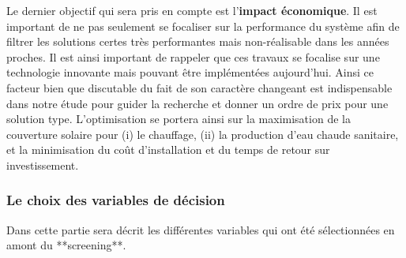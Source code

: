 Le dernier objectif qui sera pris en compte est l’\textbf{impact économique}. Il
est important de ne pas seulement se focaliser sur la performance du système afin
de filtrer les solutions certes très performantes mais non-réalisable dans les années
proches. Il est ainsi important de rappeler que ces travaux se focalise sur une
technologie innovante mais pouvant être implémentées aujourd’hui.
Ainsi ce facteur bien que discutable du fait de son caractère changeant est indispensable
dans notre étude pour guider la recherche et donner un ordre de prix pour une solution
type.
L’optimisation se portera ainsi sur la maximisation de la couverture solaire pour
(i) le chauffage, (ii) la production d’eau chaude sanitaire, et la minimisation
du coût d’installation et du temps de retour sur investissement.

\subsubsection{Le choix des variables de décision} %
\label{ssub:le_choix_des_variables_de_decision}

Dans cette partie sera décrit les différentes variables qui ont été sélectionnées
en amont du **screening**.

